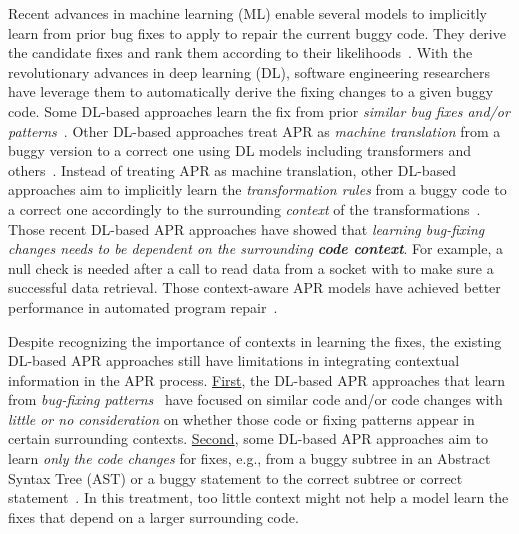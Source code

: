 Recent advances in machine learning (ML) enable several models to
implicitly learn from prior bug fixes to apply to repair the current
buggy code. They derive the candidate fixes and rank them according to
their
likelihoods~\cite{long2016automatic,long2017automatic,saha2017elixir}.
With the revolutionary advances in deep learning (DL), software
engineering researchers have leverage them to automatically derive the
fixing changes to a given buggy code. Some DL-based approaches learn
the fix from prior {\em similar bug fixes and/or
  patterns}~\cite{gupta2017deepfix,white2019sorting,white2016deep}.
Other DL-based approaches treat APR as {\em machine translation} from
a buggy version to a correct one using DL models including
transformers and
others~\cite{chakrabortycodit,chen2018sequencer,hata2018learning,tufano2018empirical,see2017get}. Instead
of treating APR as machine translation, other DL-based approaches aim
to implicitly learn the {\em transformation rules} from a buggy code
to a correct one accordingly to the surrounding {\em context} of the
transformations~\cite{chen2018sequencer,icse20,cure-icse21,lutellier2020coconut}. Those
recent DL-based APR approaches have showed that {\em learning
  bug-fixing changes needs to be dependent on the surrounding {\bf
    code context}}. For example, a null check is needed after a call
to read data from a socket with  to make
sure a successful data retrieval. Those context-aware APR models have
achieved better performance in automated program
repair~\cite{icse20,lutellier2020coconut,cure-icse21}.

Despite recognizing the importance of contexts in learning the fixes,
the existing DL-based APR approaches still have limitations in
integrating contextual information in the APR
process. \underline{First}, the DL-based APR approaches that learn
from {\em bug-fixing patterns}~\cite{white2016deep,gupta2017deepfix}
have focused on similar code and/or code changes with {\em little or
  no consideration} on whether those code or fixing patterns appear in
certain surrounding contexts. \underline{Second}, some DL-based APR
approaches aim to learn {\em only the code changes} for fixes, e.g.,
from a buggy subtree in an Abstract Syntax Tree (AST) or a buggy
statement to the correct subtree or correct
statement~\cite{chakrabortycodit,see2017get}. In this treatment, too
little context might not help a model learn the fixes that depend on a
larger surrounding code.

